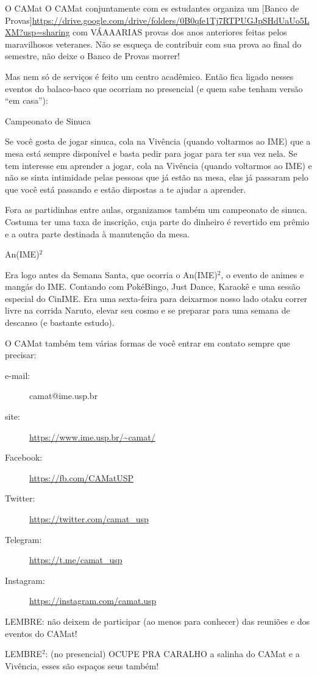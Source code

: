 \begin{secao}{O CAMat}
O CAMat conjuntamente com es estudantes organiza um
[Banco de Provas]\url{https://drive.google.com/drive/folders/0B0qfe1Tj7RTPUGJpSHdUaUo5LXM?usp=sharing}
com VÁAAARIAS provas dos anos anteriores feitas pelos maravilhosos veteranes.
Não se esqueça de contribuir com sua prova ao final do semestre, não
deixe o Banco de Provas morrer!

  
Mas nem só de serviços é feito um centro acadêmico. Então fica ligado nesses
eventos do balaco-baco que ocorriam no presencial (e quem sabe tenham versão “em casa”):

\begin{subsecao}{Campeonato de Sinuca}

Se você gosta de jogar sinuca, cola na Vivência (quando voltarmos ao IME) que
a mesa está sempre disponível e basta pedir para jogar para ter sua vez nela.
Se tem interesse em aprender a jogar, cola na Vivência (quando voltarmos ao IME)
e não se sinta intimidade pelas pessoas que já estão na mesa, elas já passaram pelo
que você está passando e estão dispostas a te ajudar a aprender.

Fora as partidinhas entre aulas, organizamos também um campeonato de sinuca. Costuma
ter uma taxa de inscrição, cuja parte do dinheiro é revertido em prêmio e a outra parte
destinada à manutenção da mesa.

\end{subsecao}

\begin{subsecao}{An(IME)$^2$}

Era logo antes da Semana Santa, que ocorria o An(IME)$^2$, o evento de animes e
mangás do IME. Contando com PokéBingo, Just Dance, Karaokê e uma sessão especial do CinIME.
Era uma sexta-feira para deixarmos nosso lado otaku correr livre na corrida Naruto,
elevar seu cosmo e se preparar para uma semana de descanso (e bastante estudo).

\end{subsecao}


O CAMat também tem várias formas de você entrar em contato sempre que precisar:

\begin{description}
\item [e-mail:] camat@ime.usp.br
\item [site:] \url{https://www.ime.usp.br/~camat/}
\item [Facebook:] \url{https://fb.com/CAMatUSP}
\item [Twitter:] \url{https://twitter.com/camat_usp}
\item [Telegram:] \url{https://t.me/camat_usp}
\item [Instagram:] \url{https://instagram.com/camat.usp}
\end{description}

LEMBRE: não deixem de participar (ao menos para conhecer) das reuniões e dos eventos do CAMat!

LEMBRE$^2$: (no presencial) OCUPE PRA CARALHO a salinha do CAMat e a Vivência,
esses são espaços seus também!

\end{secao}

